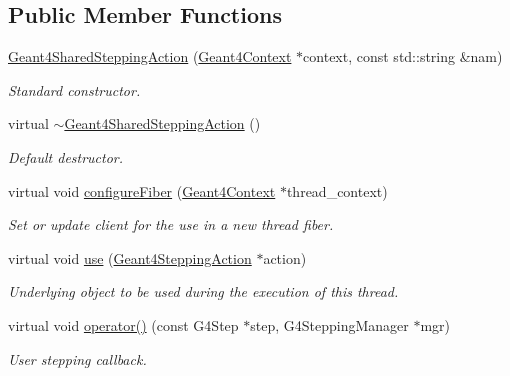 \subsection*{Public Member Functions}
\begin{DoxyCompactItemize}
\item 
\hyperlink{class_d_d4hep_1_1_simulation_1_1_geant4_shared_stepping_action_a0b5677a3782b0762414d8b3fae4ab10f}{Geant4SharedSteppingAction} (\hyperlink{class_d_d4hep_1_1_simulation_1_1_geant4_context}{Geant4Context} $\ast$context, const std::string \&nam)
\begin{DoxyCompactList}\small\item\em Standard constructor. \item\end{DoxyCompactList}\item 
virtual \hyperlink{class_d_d4hep_1_1_simulation_1_1_geant4_shared_stepping_action_a3a2b73cd49e3441d740456240d5125ab}{$\sim$Geant4SharedSteppingAction} ()
\begin{DoxyCompactList}\small\item\em Default destructor. \item\end{DoxyCompactList}\item 
virtual void \hyperlink{class_d_d4hep_1_1_simulation_1_1_geant4_shared_stepping_action_ae023874861eb3048eba53ef6cd253224}{configureFiber} (\hyperlink{class_d_d4hep_1_1_simulation_1_1_geant4_context}{Geant4Context} $\ast$thread\_\-context)
\begin{DoxyCompactList}\small\item\em Set or update client for the use in a new thread fiber. \item\end{DoxyCompactList}\item 
virtual void \hyperlink{class_d_d4hep_1_1_simulation_1_1_geant4_shared_stepping_action_a2c04725bc0820515ab86fde2ead70829}{use} (\hyperlink{class_d_d4hep_1_1_simulation_1_1_geant4_stepping_action}{Geant4SteppingAction} $\ast$action)
\begin{DoxyCompactList}\small\item\em Underlying object to be used during the execution of this thread. \item\end{DoxyCompactList}\item 
virtual void \hyperlink{class_d_d4hep_1_1_simulation_1_1_geant4_shared_stepping_action_a5128c3fa4f478cda734a35a09ee86ae0}{operator()} (const G4Step $\ast$step, G4SteppingManager $\ast$mgr)
\begin{DoxyCompactList}\small\item\em User stepping callback. \item\end{DoxyCompactList}\end{DoxyCompactItemize}
